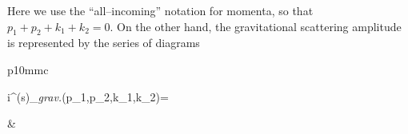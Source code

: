 \documentclass[12pt]{article}
\newcommand{\M}{\mathcal{M}}
\begin{document}
Here we use the ``all--incoming'' notation for momenta, so that $p_1+p_2+k_1+k_2=0$. On the other hand, the gravitational scattering amplitude is represented by the series of diagrams
\newline
\begin{tabular}{p{10mm}c}
\begin{flalign*}
i\M^{(s)}_{\textit{grav.}}(p_1,p_2,k_1,k_2)=
\end{flalign*}
&
 \\

\end{tabular}
\end{document}
